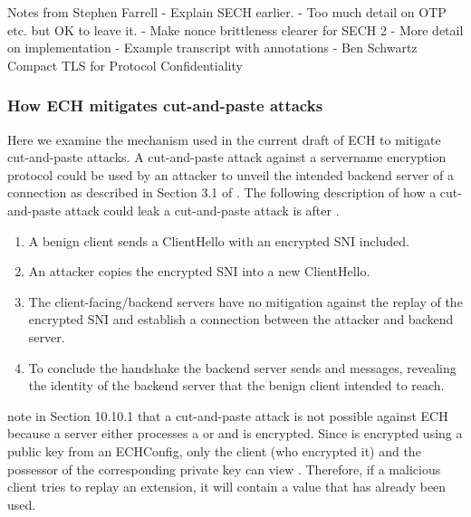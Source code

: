 Notes from Stephen Farrell
- Explain SECH earlier.
- Too much detail on OTP etc. but OK to leave it.
- Make nonce brittleness clearer for SECH 2
- More detail on implementation
- Example transcript with annotations
- Ben Schwartz Compact TLS for Protocol Confidentiality


\subsubsection{How ECH mitigates cut-and-paste attacks}
Here we examine the mechanism used in the current draft of ECH to mitigate cut-and-paste attacks. A cut-and-paste attack against a servername encryption protocol could be used by an attacker to unveil the intended backend server of a connection as described in Section 3.1 of \cite{rfc8744-issues}. The following description of how a cut-and-paste attack could leak a cut-and-paste attack is after \cite{rfc8744-issues}.
\begin{enumerate}
    \item A benign client sends a ClientHello with an encrypted SNI included.
    \item An attacker copies the encrypted SNI into a new ClientHello.
    \item The client-facing/backend servers have no mitigation against the replay of the encrypted SNI and establish a connection between the attacker and backend server.
    \item To conclude the handshake the backend server sends  and  messages, revealing the identity of the backend server that the benign client intended to reach. 
\end{enumerate}
\cite{esni} note in Section 10.10.1 that a cut-and-paste attack is not possible against ECH because a server either processes a  or  and  is encrypted. Since  is encrypted using a public key from an ECHConfig, only the client (who encrypted it) and the possessor of the corresponding private key can view . Therefore, if a malicious client tries to replay an  extension, it will contain a  value that has already been used.

